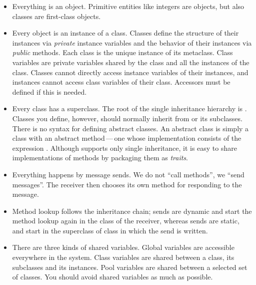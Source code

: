 \documentclass[a4paper,10pt,twoside]{book}
\begin{document}
\begin{itemize}
  \item Everything is an object.
  Primitive entities like integers are objects, but also classes are first-class objects.

  \item Every object is an instance of a class.
  Classes define the structure of their instances via \emph{private} instance variables and the behavior of their instances via \emph{public} methods. Each class is the unique instance of its metaclass.  Class variables are private variables shared by the class and all the instances of the class.
  Classes cannot directly access instance variables of their instances, and instances cannot access class variables of their class.
  Accessors must be defined if this is needed.

  \item Every class has a superclass.
  The root of the single inheritance hierarchy is .
  Classes you define, however, should normally inherit from  or its subclasses.
  There is no syntax for defining abstract classes.
  An abstract class is simply a class with an abstract method\,---\,one 
  whose implementation consists of the expression .
  Although \squeak supports only single inheritance, it is easy to share implementations of methods by packaging them as \emph{traits}.

  \item Everything happens by message sends.
	We do not ``call methods'', we ``send messages''.
	The receiver then chooses its own method for responding to the message.

  \item Method lookup follows the inheritance chain;
  \self sends are dynamic and start the method lookup again in the class of the receiver, whereas
  \super sends are static, and start in the superclass of class in which the \super send is written.
  
  \item There are three kinds of shared variables.
  		Global variables are accessible everywhere in the system.
		Class variables are shared between a class, its subclasses and its instances.
		Pool variables are shared between a selected set of classes.
		You should avoid shared variables as much as possible.

\end{itemize}

\ifx\wholebook\relax\else
   
   
\end{document}
